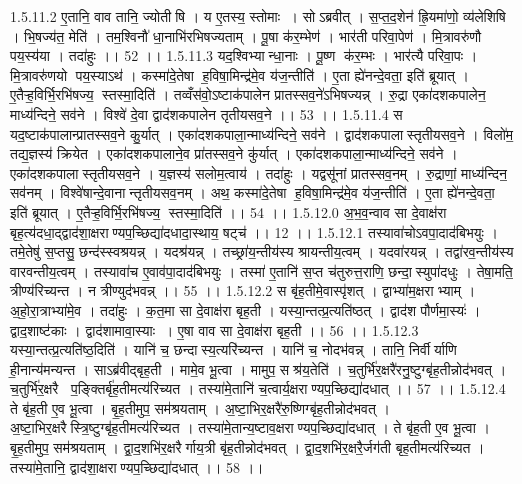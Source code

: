 1.5.11.2
ए॒तानि॒ वाव तानि॒ ज्योती॑षि । य ए॒तस्य॒ स्तोमाः । सोऽब्रवीत् । स॒प्त॒द॒शेन॑ ह्रि॒यमा॑णो॒ व्य॑लेशिषि । भि॒षज्य॑त॒ मेति॑ । तम॒श्विनौ॑ धा॒नाभि॑रभिषज्यताम् । पू॒षा क॑र॒म्भेण॑ । भार॑ती परिवा॒पेण॑ । मि॒त्रावरु॑णौ पय॒स्य॑या । तदा॑हुः ।। 52 ।।
1.5.11.3
यद॒श्विभ्यान्धा॒नाः । पू॒ष्ण क॑र॒म्भः । भार॑त्यै परिवा॒पः । मि॒त्रावरु॑णयो पय॒स्याऽथ॑ । कस्मा॑दे॒तेषा॑ ह॒विषा॒मिन्द्र॑मे॒व य॑ज॒न्तीति॑ । ए॒ता ह्ये॑नन्दे॒वता॒ इति॑ ब्रूयात् । ए॒तैऱ्ह॒विर्भि॒रभि॑षज्य॒॒ स्तस्मा॒दिति॑ । तव्वँस॑वो॒ऽष्टाक॑पालेन प्रातस्सव॒ने॑ऽभिषज्यन्न् । रु॒द्रा एका॑दशकपालेन॒ माध्य॑न्दिने॒ सव॑ने । विश्वे॑ दे॒वा द्वाद॑शकपालेन तृतीयसव॒ने ।। 53 ।।
1.5.11.4
स यद॒ष्टाक॑पालान्प्रातस्सव॒ने कु॒र्यात् । एका॑दशकपाला॒न्माध्य॑न्दिने॒ सव॑ने । द्वाद॑शकपालास्तृतीयसव॒ने । विलो॑म॒ तद्य॒ज्ञस्य॑ क्रियेत । एका॑दशकपालाने॒व प्रा॑तस्सव॒ने कु॑र्यात् । एका॑दशकपाला॒न्माध्य॑न्दिने॒ सव॑ने । एका॑दशकपालास्तृतीयसव॒ने । य॒ज्ञस्य॑ सलोम॒त्वाय॑ । तदा॑हुः । यद्वसू॑नां प्रातस्सव॒नम् । रु॒द्राणां॒ माध्य॑न्दिन॒॒ सव॑नम् । विश्वे॑षान्दे॒वानान्तृतीयसव॒नम् । अथ॒ कस्मा॑दे॒तेषा॑ ह॒विषा॒मिन्द्र॑मे॒व य॑ज॒न्तीति॑ । ए॒ता ह्ये॑नन्दे॒वता॒ इति॑ ब्रूयात् । ए॒तैऱ्ह॒विर्भि॒रभि॑षज्य॒॒ स्तस्मा॒दिति॑ ।। 54 ।।
1.5.12.0
अ॒भ॒व॒न्वाव सा दे॒वाक्ष॑रा बृह॒त्य॑दधा॒द्द्वाद॑शा॒क्षराण्यप॒च्छिद्या॑दधादा॒स्थाय॒ षट्च॑ ।। 12 ।।
1.5.12.1
तस्यावा॑चोऽवपा॒दाद॑बिभयुः । तमे॒तेषु॑ स॒प्तसु॒ छन्द॑स्स्वश्रयन्न् । यदश्र॑यन्न् । तच्छ्रा॑य॒न्तीय॑स्य श्रायन्तीय॒त्वम् । यदवा॑रयन्न् । तद्वा॑रव॒न्तीय॑स्य वारवन्तीय॒त्वम् । तस्यावा॑च ए॒वाव॑पा॒दाद॑बिभयुः । तस्मा॑ ए॒तानि॑ स॒प्त च॑तुरुत्त॒राणि॒ छन्दा॒॒स्युपा॑दधुः । तेषा॒मति॒ त्रीण्य॑रिच्यन्त । न त्रीण्युद॑भवन्न् ।। 55 ।।
1.5.12.2
स बृ॑ह॒तीमे॒वास्पृ॑शत् । द्वाभ्या॑म॒क्षराभ्याम् । अ॒हो॒रा॒त्राभ्या॑मे॒व । तदा॑हुः । क॒त॒मा सा दे॒वाक्ष॑रा बृह॒ती । यस्या॒न्तत्प्र॒त्यति॑ष्ठत् । द्वाद॑श पौर्णमा॒स्यः॑ । द्वाद॒शाष्ट॑काः । द्वाद॑शामावा॒स्याः । ए॒षा वाव सा दे॒वाक्ष॑रा बृह॒ती ।। 56 ।।
1.5.12.3
यस्या॒न्तत्प्र॒त्यति॑ष्ठ॒दिति॑ । यानि॑ च॒ छन्दा॑स्य॒त्यरि॑च्यन्त । यानि॑ च॒ नोदभ॑वन्न् । तानि॒ निर्वीर्याणि ही॒नान्य॑मन्यन्त । साऽब्र॑वीद्बृह॒ती । मामे॒व भू॒त्वा । मामुप॒ सश्र॑य॒तेति॑ । च॒तुर्भि॑र॒क्षरै॑रनु॒ष्टुग्बृ॑ह॒तीन्नोद॑भवत् । च॒तुर्भि॑र॒क्षरै प॒ङ्क्तिर्बृ॑ह॒तीमत्य॑रिच्यत । तस्या॑मे॒तानि॑ च॒त्वार्य॒क्षराण्यप॒च्छिद्या॑दधात् ।। 57 ।।
1.5.12.4
ते बृ॑ह॒ती ए॒व भू॒त्वा । बृ॒ह॒तीमुप॒ सम॑श्रयताम् । अ॒ष्टा॒भिर॒क्षरै॑रु॒ष्णिग्बृ॑ह॒तीन्नोद॑भवत् । अ॒ष्टा॒भिर॒क्षरैस्त्रि॒ष्टुग्बृ॑ह॒तीमत्य॑रिच्यत । तस्या॑मे॒तान्य॒ष्टाव॒क्षराण्यप॒च्छिद्या॑दधात् । ते बृ॑ह॒ती ए॒व भू॒त्वा । बृ॒ह॒तीमुप॒ सम॑श्रयताम् । द्वा॒द॒शभि॑र॒क्षरैर्गाय॒त्री बृ॑ह॒तीन्नोद॑भवत् । द्वा॒द॒शभि॑र॒क्षरै॒र्जग॑ती बृह॒तीमत्य॑रिच्यत । तस्या॑मे॒तानि॒ द्वाद॑शा॒क्षराण्यप॒च्छिद्या॑दधात् ।। 58 ।।
